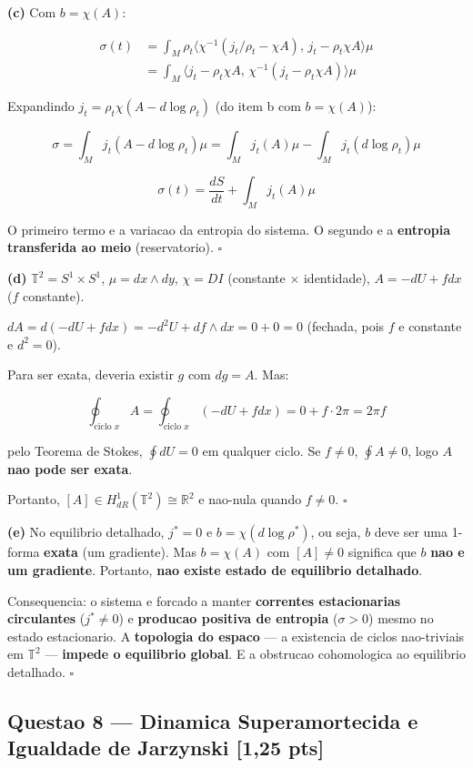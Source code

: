 \documentclass[12pt,a4paper,oneside]{article}
\begin{document}
\textbf{(c)} Com $b = \chi(A)$:

\begin{align*}
\sigma(t) &= \int_M \rho_t\langle \chi^{-1}(j_t/\rho_t - \chi A),\,
j_t - \rho_t\chi A\rangle\mu \\
&= \int_M \langle j_t - \rho_t\chi A,\, \chi^{-1}(j_t - \rho_t\chi A)
\rangle\mu
\end{align*}

Expandindo $j_t = \rho_t\chi(A - d\log\rho_t)$ (do item b com $b=\chi(A)$):

$$\sigma = \int_M j_t(A - d\log\rho_t)\mu =
\int_M j_t(A)\mu - \int_M j_t(d\log\rho_t)\mu$$

$$\boxed{\sigma(t) = \frac{dS}{dt} + \int_M j_t(A)\mu}$$

O primeiro termo e a variacao da entropia do sistema. O segundo e a
\textbf{entropia transferida ao meio} (reservatorio). $\square$

\textbf{(d)} $\mathbb{T}^2 = S^1 \times S^1$, $\mu = dx\wedge dy$,
$\chi = DI$ (constante $\times$ identidade), $A = -dU + fdx$ ($f$
constante).

$dA = d(-dU + fdx) = -d^2U + df\wedge dx = 0 + 0 = 0$ (fechada, pois $f$
e constante e $d^2=0$).

Para ser exata, deveria existir $g$ com $dg = A$. Mas:

$$\oint_{\text{ciclo }x} A = \oint_{\text{ciclo }x} (-dU + fdx) =
0 + f\cdot 2\pi = 2\pi f$$

pelo Teorema de Stokes, $\oint dU = 0$ em qualquer ciclo. Se $f \neq 0$,
$\oint A \neq 0$, logo $A$ \textbf{nao pode ser exata}.

Portanto, $[A] \in H^1_{dR}(\mathbb{T}^2) \cong \mathbb{R}^2$ e nao-nula
quando $f \neq 0$. $\square$

\textbf{(e)} No equilibrio detalhado, $j^* = 0$ e $b = \chi(d\log\rho^*)$,
ou seja, $b$ deve ser uma 1-forma \textbf{exata} (um gradiente). Mas
$b = \chi(A)$ com $[A] \neq 0$ significa que $b$ \textbf{nao e um
gradiente}. Portanto, \textbf{nao existe estado de equilibrio detalhado}.

Consequencia: o sistema e forcado a manter \textbf{correntes estacionarias
circulantes} ($j^* \neq 0$) e \textbf{producao positiva de entropia}
($\sigma > 0$) mesmo no estado estacionario. A \textbf{topologia do
espaco} — a existencia de ciclos nao-triviais em $\mathbb{T}^2$ —
\textbf{impede o equilibrio global}. E a obstrucao cohomologica ao
equilibrio detalhado. $\square$

\subsection{Questao 8 — Dinamica Superamortecida e Igualdade de Jarzynski [1,25 pts]}
\end{document}
